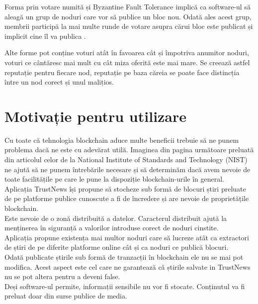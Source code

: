 Forma prin votare numită și Byzantine Fault Tolerance implică ca software-ul să aleagă un grup de noduri care vor să publice un bloc nou. Odată ales acest grup, membrii participă la mai multe runde de votare asupra cărui bloc este publicat și implicit cine îl va publica \cite{Blockchain_Overview_IEEE}. 

Alte forme pot conține voturi atât în favoarea cât și împotriva anumitor noduri, voturi ce cântăresc mai mult cu cât miza oferită este mai mare. Se creează astfel reputație pentru fiecare nod, reputație pe baza căreia se poate face distincția între un nod corect și unul malițios.\\

\clearpage

\section{Motivație pentru utilizare}

Cu toate că tehnologia blockchain aduce multe beneficii trebuie să ne punem problema dacă ne este cu adevărat utilă. Imaginea din pagina următoare preluată din articolul celor de la National Institute of Standards and Technology (NIST) ne ajută să ne punem întrebările necesare și să determinăm dacă avem nevoie de toate facilitățile pe care le pune la dispoziție blockchain-urile în general.\\

Aplicația TrustNews își propune să stocheze sub formă de blocuri știri preluate de pe platforme publice cunoscute a fi de încredere și are nevoie de proprietățile blockchain.\\

Este nevoie de o zonă distribuită a datelor. Caracterul distribuit ajută la menținerea în siguranță a valorilor introduse corect de noduri cinstite.\\

Aplicația propune existența mai multor noduri care să lucreze atât ca extractori de știri de pe diferite platforme online cât și ca noduri ce publică blocuri.\\

Odată publicate știrile sub formă de tranzacții în blockchain ele nu se mai pot modifica. 
Acest aspect este cel care ne garantează că știrile salvate in TrustNews nu se pot altera pentru a deveni false.\\

Deși software-ul permite, informații sensibile nu vor fi stocate. Conținutul va fi preluat doar din surse publice de media.\\

